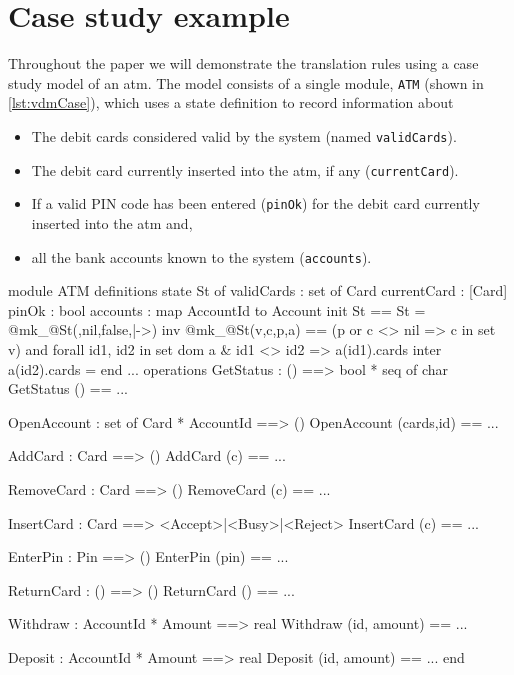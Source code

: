 \section{Case study example}
\label{sec:case}

Throughout the paper we will demonstrate the translation rules using a
case study model of an \ac{atm}. The model consists of a single
module, \texttt{ATM} (shown in \autoref{lst:vdmCase}), which uses a
state definition to record information about

\begin{itemize}

\item The debit cards considered valid by the system (named
  \texttt{validCards}).

\item The debit card currently inserted into the \ac{atm}, if any
  (\texttt{currentCard}).

\item If a valid PIN code has been entered (\texttt{pinOk}) for the
  debit card currently inserted into the \ac{atm} and,

\item all the bank accounts known to the system (\texttt{accounts}).

\end{itemize}

\begin{vdmsl}[style=customVdm,caption={\ac{vdmsl} module representing
an \ac{atm}.},label={lst:vdmCase}]
module ATM
definitions
state St of
 validCards : set of Card
 currentCard : [Card]
 pinOk : bool
 accounts : map AccountId to Account
 init St == St = @mk_@St({},nil,false,{|->})
 inv @mk_@St(v,c,p,a) ==
  (p or c <> nil => c in set v)
  and
  forall id1, id2 in set dom a &
   id1 <> id2 =>
   a(id1).cards inter a(id2).cards = {}
end
 ...
operations
GetStatus : () ==> bool * seq of char
GetStatus () == ...

OpenAccount : set of Card * AccountId ==> ()
OpenAccount (cards,id) == ...

AddCard : Card ==> ()
AddCard (c) == ...

RemoveCard : Card ==> ()
RemoveCard (c) == ...

InsertCard : Card ==>
  <Accept>|<Busy>|<Reject>  
InsertCard (c) == ...

EnterPin : Pin ==> ()
EnterPin (pin) == ...

ReturnCard : () ==> ()
ReturnCard () == ...

Withdraw : AccountId * Amount ==> real
Withdraw (id, amount) == ...

Deposit : AccountId * Amount ==> real
Deposit (id, amount) == ...
end
\end{vdmsl}

